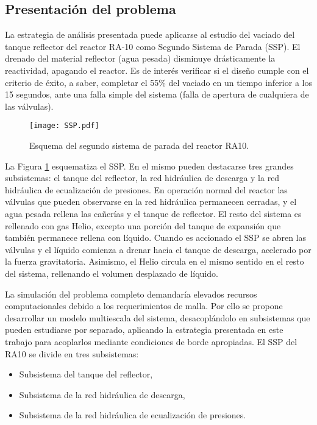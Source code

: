 \subsection*{Presentación del problema}
La estrategia de análisis presentada puede aplicarse al estudio del vaciado del tanque reflector del reactor RA-10 como Segundo Sistema de Parada (SSP).
El drenado del material reflector (agua pesada) disminuye drásticamente la reactividad, apagando el reactor.
Es de interés verificar si el diseño cumple con el criterio de éxito,
a saber, completar el 55\% del vaciado en un tiempo inferior a los 15 segundos,
ante una falla simple del sistema (falla de apertura de cualquiera de las válvulas).

\begin{figure}['ht]
\centering{}\texttt{[image: SSP.pdf]}
\caption{Esquema del segundo sistema de parada del reactor RA10.} \label{fig:SSP} 
\end{figure}

La Figura \ref{fig:SSP} esquematiza el SSP. 
En el mismo pueden destacarse tres grandes subsistemas: el tanque del reflector, la red hidráulica de descarga y
la red hidráulica de ecualización de presiones. En operación normal del reactor las
válvulas que pueden observarse en la red hidráulica permanecen cerradas, y el agua pesada rellena las cañerías y el tanque de reflector. 
El resto del sistema es rellenado con gas Helio, excepto una porción del tanque de expansión que también permanece rellena con líquido. 
Cuando es accionado el SSP se abren las válvulas y el líquido comienza a drenar hacia el tanque de descarga, acelerado por la fuerza gravitatoria. 
Asimismo, el Helio circula en el mismo sentido en el resto del sistema, rellenando el volumen desplazado de líquido.

La simulación del problema completo demandaría elevados recursos computacionales debido a los requerimientos de malla. 
Por ello se propone desarrollar un modelo multiescala del sistema,
desacoplándolo en subsistemas que pueden estudiarse por separado, 
aplicando la estrategia presentada en este trabajo para acoplarlos mediante condiciones de borde apropiadas.
El SSP del RA10 se divide en tres subsistemas:

\begin{itemize}
\item Subsistema del tanque del reflector,
\item Subsistema de la red hidráulica de descarga,
\item Subsistema de la red hidráulica de ecualización de presiones.
\end{itemize}

